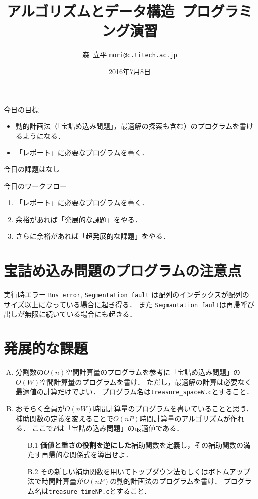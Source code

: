 \documentclass[a4paper,twoside,onecolumn,openany,article]{memoir}
\title{アルゴリズムとデータ構造~プログラミング演習}
\date{2016年7月8日}
\author{森~立平 \texttt{mori@c.titech.ac.jp}}
\theoremstyle{remark}
\begin{document}
\maketitle

\noindent
今日の目標
\begin{itemize}
\item 動的計画法（「宝詰め込み問題」，最適解の探索も含む）のプログラムを書けるようになる．
\item 「レポート」に必要なプログラムを書く．
\end{itemize}

\noindent
今日の課題はなし

\vspace{.5em}
\noindent
今日のワークフロー
\begin{enumerate}
\item 「レポート」に必要なプログラムを書く．
\item 余裕があれば「発展的な課題」をやる．
\item さらに余裕があれば「超発展的な課題」をやる．
\end{enumerate}

\section{宝詰め込み問題のプログラムの注意点}
実行時エラー \texttt{Bus error}, \texttt{Segmentation fault} は配列のインデックスが配列のサイズ以上になっている場合に起き得る．
また \texttt{Segmantation fault}は再帰呼び出しが無限に続いている場合にも起きる．


\section{発展的な課題}
\begin{enumerate}[A.]
\item 分割数の$O(n)$空間計算量のプログラムを参考に「宝詰め込み問題」の$O(W)$空間計算量のプログラムを書け．
ただし，最適解の計算は必要なく最適値の計算だけでよい．
プログラム名は\texttt{treasure\_spaceW.c}とすること．
\item おそらく全員が$O(nW)$時間計算量のプログラムを書いていることと思う．
補助関数の定義を変えることで$O(nP)$時間計算量のアルゴリズムが作れる．
ここで$P$は「宝詰め込み問題」の最適値である．
\begin{enumerate}
\item[B.1] \textbf{価値と重さの役割を逆にした}補助関数を定義し，その補助関数の満たす再帰的な関係式を導出せよ．
\item[B.2] その新しい補助関数を用いてトップダウン法もしくはボトムアップ法で時間計算量が$O(nP)$の動的計画法のプログラムを書け．
プログラム名は\texttt{treasure\_timeNP.c}とすること．
\end{enumerate}
\end{enumerate}
\end{document}
